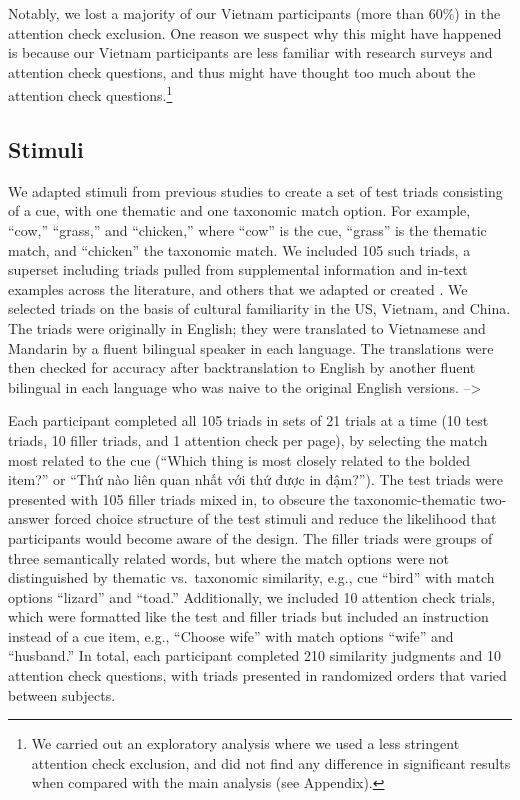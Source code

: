 \documentclass[10pt, letterpaper]{article}
\begin{document}
Notably, we lost a majority of our Vietnam participants (more than 60\%)
in the attention check exclusion. One reason we suspect why this might
have happened is because our Vietnam participants are less familiar with
research surveys and attention check questions, and thus might have
thought too much about the attention check questions.\footnote{We
  carried out an exploratory analysis where we used a less stringent
  attention check exclusion, and did not find any difference in
  significant results when compared with the main analysis (see
  Appendix).}

\hypertarget{stimuli}{%
\subsection{Stimuli}\label{stimuli}}

We adapted stimuli from previous studies to create a set of test triads
consisting of a cue, with one thematic and one taxonomic match option.
For example, ``cow,'' ``grass,'' and ``chicken,'' where ``cow'' is the
cue, ``grass'' is the thematic match, and ``chicken'' the taxonomic
match. We included 105 such triads, a superset including triads pulled
from supplemental information and in-text examples across the
literature, and others that we adapted or created . We selected triads
on the basis of cultural familiarity in the US, Vietnam, and China. The
triads were originally in English; they were translated to Vietnamese
and Mandarin by a fluent bilingual speaker in each language. The
translations were then checked for accuracy after backtranslation to
English by another fluent bilingual in each language who was naive to
the original English versions. --\textgreater{}

Each participant completed all 105 triads in sets of 21 trials at a time
(10 test triads, 10 filler triads, and 1 attention check per page), by
selecting the match most related to the cue (``Which thing is most
closely related to the bolded item?'' or ``Thứ nào liên quan nhất với
thứ được in đậm?''). The test triads were presented with 105 filler
triads mixed in, to obscure the taxonomic-thematic two-answer forced
choice structure of the test stimuli and reduce the likelihood that
participants would become aware of the design. The filler triads were
groups of three semantically related words, but where the match options
were not distinguished by thematic vs.~taxonomic similarity, e.g., cue
``bird'' with match options ``lizard'' and ``toad.'' Additionally, we
included 10 attention check trials, which were formatted like the test
and filler triads but included an instruction instead of a cue item,
e.g., ``Choose wife'' with match options ``wife'' and ``husband.'' In
total, each participant completed 210 similarity judgments and 10
attention check questions, with triads presented in randomized orders
that varied between subjects.
\end{document}
